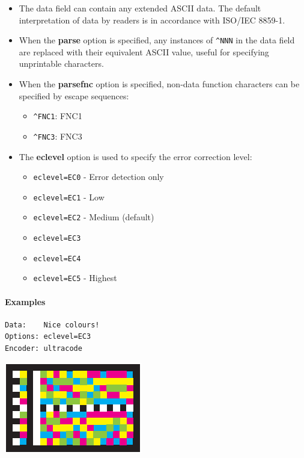 \begin{itemize}
\tightlist
\item
  The data field can contain any extended ASCII data. The default
  interpretation of data by readers is in accordance with ISO/IEC
  8859-1.
\item
  When the \textbf{parse} option is specified, any instances of
  \texttt{\^{}NNN} in the data field are replaced with their equivalent
  ASCII value, useful for specifying unprintable characters.
\item
  When the \textbf{parsefnc} option is specified, non-data function
  characters can be specified by escape sequences:

  \begin{itemize}
  \tightlist
  \item
    \texttt{\^{}FNC1}: FNC1
  \item
    \texttt{\^{}FNC3}: FNC3
  \end{itemize}
\item
  The \textbf{eclevel} option is used to specify the error correction
  level:

  \begin{itemize}
  \tightlist
  \item
    \texttt{eclevel=EC0} - Error detection only
  \item
    \texttt{eclevel=EC1} - Low
  \item
    \texttt{eclevel=EC2} - Medium (default)
  \item
    \texttt{eclevel=EC3}
  \item
    \texttt{eclevel=EC4}
  \item
    \texttt{eclevel=EC5} - Highest
  \end{itemize}
\end{itemize}

\hypertarget{examples-44}{%
\paragraph{Examples}\label{examples-44}}

\begin{verbatim}
Data:    Nice colours!
Options: eclevel=EC3
Encoder: ultracode
\end{verbatim}

\includegraphics{images/ultracode-1.eps}

